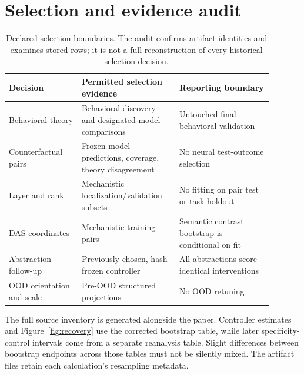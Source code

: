 \documentclass{article}
\begin{document}



\clearpage
\appendix
\section{Selection and evidence audit}\label{app:selection}
\begin{table}[htbp]
\centering\small

\caption{Full selection counts and recovery for all retained Qwen controllers. Counts are rendered pairs.}
\label{tab:controllers}
\end{table}

\begin{table}[htbp]
\centering\small
\begin{tabular}{p{0.25\linewidth}p{0.32\linewidth}p{0.32\linewidth}}
\toprule
Decision & Permitted selection evidence & Reporting boundary \\
\midrule
Behavioral theory & Behavioral discovery and designated model comparisons & Untouched final behavioral validation \\
Counterfactual pairs & Frozen model predictions, coverage, theory disagreement & No neural test-outcome selection \\
Layer and rank & Mechanistic localization/validation subsets & No fitting on pair test or task holdout \\
DAS coordinates & Mechanistic training pairs & Semantic contrast bootstrap is conditional on fit \\
Abstraction follow-up & Previously chosen, hash-frozen controller & All abstractions score identical interventions \\
OOD orientation and scale & Pre-OOD structured projections & No OOD retuning \\
\bottomrule
\end{tabular}
\caption{Declared selection boundaries. The audit confirms artifact identities and examines stored rows; it is not a full reconstruction of every historical selection decision.}
\end{table}

The full source inventory is generated alongside the paper. Controller estimates and Figure~\ref{fig:recovery} use the corrected bootstrap table, while later specificity-control intervals come from a separate reanalysis table. Slight differences between bootstrap endpoints across those tables must not be silently mixed. The artifact files retain each calculation's resampling metadata.
\end{document}
